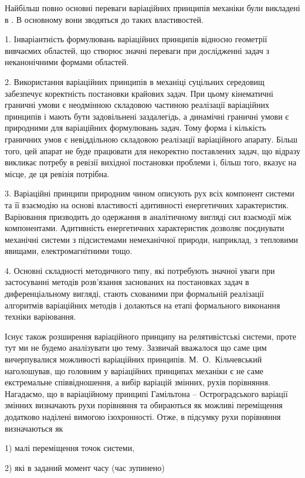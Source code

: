 \documentclass[11pt, reqno]{amsart}
\begin{document}
Найбільш повно основні переваги варіаційних принципів механіки були викладені в \cite{Pol}. В основному вони зводяться до таких властивостей.

1. Інваріантність формулювань варіаційних принципів відносно геометрії вивчаємих областей, що створює значні переваги при дослідженні задач з неканонічними формами областей.

2. Використання варіаційних принципів в механіці суцільних середовищ забезпечує коректність постановки крайових задач. При цьому кінематичні граничні умови є неодмінною складовою частиною реалізації варіаційних принципів і мають бути задовільнені заздалегідь, а динамічні граничні умови є природними для варіаційних формулювань задач. Тому форма і кількість граничних умов є невіддільною складовою реалізації варіаційного апарату. Більш того, цей апарат не буде працювати для некоректно поставлених задач, що відразу викликає потребу в ревізії вихідної постановки проблеми і, більш того, вказує на місце, де ця ревізія потрібна.

3. Варіаційні принципи природним чином описують рух всіх компонент системи та її взаємодію на основі властивості адитивності енергетичних характеристик. Варіювання призводить до одержання в аналітичному вигляді сил взаємодії між компонентами. Адитивність енергетичних характеристик дозволяє поєднувати механічні системи з підсистемами немеханічної природи, наприклад, з тепловими явищами, електромагнітними тощо.

4. Основні складності методичного типу, які потребують значної уваги при застосуванні методів розв'язання заснованих на постановках задач в диференціальному вигляді, стають схованими при формальній реалізації алгоритмів варіаційних методів і долаються на етапі формального виконання техніки варіювання.

Існує також розширення варіаційного принципу на релятивістські системи, проте тут ми не будемо аналізувати цю тему. Зазвичай вважалося що саме цим вичерпувалися можливості варіаційних принципів. М.~О.~Кільчевський наголошував, що головним у варіаційних принципах механіки є не саме екстремальне співвідношення, а вибір варіацій змінних, рухів порівняння. Нагадаємо, що в варіаційному принципі Гамільтона -- Остроградського варіації змінних визначають рухи порівняння та обираються як можливі переміщення додатково наділені вимогою ізохронності. Отже, в підсумку рухи порівняння визначаються як

1) малі переміщення точок системи,

2) які в заданий момент часу (час зупинено)
\end{document}
